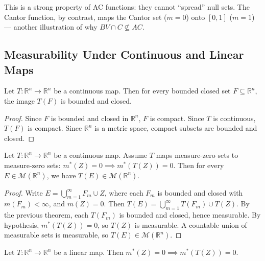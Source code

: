 \documentclass[11pt]{report}
\begin{document}
\begin{rembox}
This is a strong property of AC functions: they cannot ``spread'' null sets. The Cantor function, by contrast, maps the Cantor set ($m = 0$) onto $[0, 1]$ ($m = 1$) --- another illustration of why $BV \cap C \not\subseteq AC$.
\end{rembox}



\subsection{Measurability Under Continuous and Linear Maps}

\begin{thmbox}
Let $T: \mathbb{R}^n \to \mathbb{R}^n$ be a continuous map. Then for every bounded closed set $F \subseteq \mathbb{R}^n$, the image $T(F)$ is bounded and closed.
\end{thmbox}

\begin{proof}
Since $F$ is bounded and closed in $\mathbb{R}^n$, $F$ is compact. Since $T$ is continuous, $T(F)$ is compact. Since $\mathbb{R}^n$ is a metric space, compact subsets are bounded and closed.
\end{proof}

\begin{thmbox}
Let $T: \mathbb{R}^n \to \mathbb{R}^n$ be a continuous map. Assume $T$ maps measure-zero sets to measure-zero sets: $m^*(Z) = 0 \implies m^*(T(Z)) = 0$. Then for every $E \in \mathcal{M}(\mathbb{R}^n)$, we have $T(E) \in \mathcal{M}(\mathbb{R}^n)$.
\end{thmbox}

\begin{proof}
Write $E = \bigcup_{m=1}^{\infty} F_m \cup Z$, where each $F_m$ is bounded and closed with $m(F_m) < \infty$, and $m(Z) = 0$. Then $T(E) = \bigcup_{m=1}^{\infty} T(F_m) \cup T(Z)$. By the previous theorem, each $T(F_m)$ is bounded and closed, hence measurable. By hypothesis, $m^*(T(Z)) = 0$, so $T(Z)$ is measurable. A countable union of measurable sets is measurable, so $T(E) \in \mathcal{M}(\mathbb{R}^n)$.
\end{proof}

\begin{thmbox}
Let $T: \mathbb{R}^n \to \mathbb{R}^n$ be a linear map. Then $m^*(Z) = 0 \implies m^*(T(Z)) = 0$.
\end{thmbox}
\end{document}
